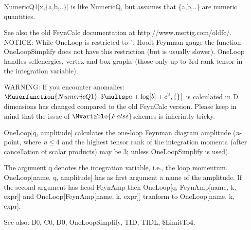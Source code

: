 

NumericQ1[x,\{a,b,..\}] is like NumericQ, but assumes that \{a,b,..\} are numeric quantities.









See also the old FeynCalc documentation at http://www.mertig.com/oldfc/. NOTICE: While OneLoop is restricted to 't Hooft Feynman gauge the function
OneLoopSimplify does not have this restriction (but is usually slower). OneLoop handles selfenergies, vertex and box-graphs (those only up to 3rd
rank
  tensor in the integration variable).

WARNING: If you encounter anomalies: \(\Muserfunction{NumericQ1}\big[3\multsp a+\log [b]+{c^2},\{\}\big]\) is calculated in D dimensions has changed
compared to the old FeynCalc version. Please keep in mind that the issue of \(\Mvariable{False}\)schemes is inherintly tricky.


OneLoop[q, amplitude] calculates the one-loop Feynman diagram amplitude ({\itshape n}-point, where {\itshape n}\(\leq \)4 and the highest tensor
rank of the integration momenta (after cancellation of scalar products) may be 3; unless
  OneLoopSimplify is used).

The argument q denotes the integration variable, i.e., the loop momentum. OneLoop[name, q, amplitude] has as first argument a name of the
  amplitude. If the second argument has head FeynAmp then OneLoop[q, FeynAmp[name, k, expr]] and OneLoop[FeynAmp[name, k, expr]] tranform
  to OneLoop[name, k, expr].



See also:  B0, C0, D0, OneLoopSimplify, TID, TIDL, \${}LimitTo4.

